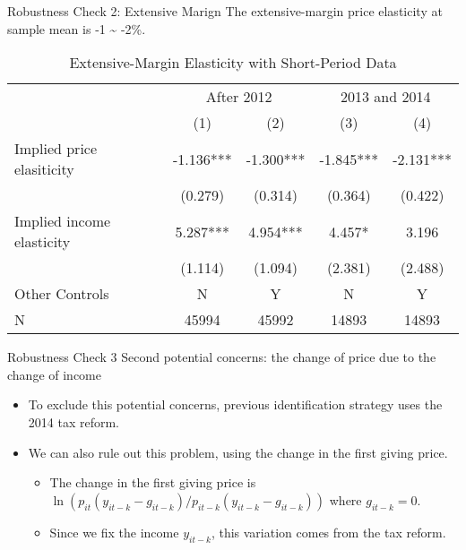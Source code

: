\documentclass[
  ignorenonframetext,
]{beamer}
\providecommand{\tightlist}{%
  \setlength{\itemsep}{0pt}\setlength{\parskip}{0pt}}
\begin{document}
\begin{frame}{Robustness Check 2: Extensive Marign}
\protect\hypertarget{robustness-check-2-extensive-marign}{}
The extensive-margin price elasticity at sample mean is -1 \textasciitilde{} -2\%.

\begin{table}

\caption{\label{tab:kableShortElasticity2Slide2}Extensive-Margin Elasticity with Short-Period Data}
\centering
\fontsize{8}{10}\selectfont
\begin{tabular}[t]{lcccc}
\toprule
\multicolumn{1}{c}{ } & \multicolumn{2}{c}{After 2012} & \multicolumn{2}{c}{2013 and 2014} \\
\cmidrule(l{3pt}r{3pt}){2-3} \cmidrule(l{3pt}r{3pt}){4-5}
 & (1) & (2) & (3) & (4)\\
\midrule
Implied price elasiticity & -1.136*** & -1.300*** & -1.845*** & -2.131***\\
 & (0.279) & (0.314) & (0.364) & (0.422)\\
Implied income elasticity & 5.287*** & 4.954*** & 4.457* & 3.196\\
 & (1.114) & (1.094) & (2.381) & (2.488)\\
Other Controls & N & Y & N & Y\\
N & 45994 & 45992 & 14893 & 14893\\
\bottomrule
\end{tabular}
\end{table}
\end{frame}

\begin{frame}{Robustness Check 3}
\protect\hypertarget{robustness-check-3}{}
Second potential concerns: the change of price due to the change of income

\begin{itemize}
\tightlist
\item
  To exclude this potential concerns, previous identification strategy uses the 2014 tax reform.
\item
  We can also rule out this problem, using the change in the first giving price.

  \begin{itemize}
  \tightlist
  \item
    The change in the first giving price is \(\ln(p_{it}(y_{it-k} - g_{it-k})/p_{it-k}(y_{it-k} - g_{it-k}))\) where \(g_{it-k} = 0\).
  \item
    Since we fix the income \(y_{it-k}\), this variation comes from the tax reform.
  \end{itemize}
\end{itemize}
\end{frame}
\end{document}
